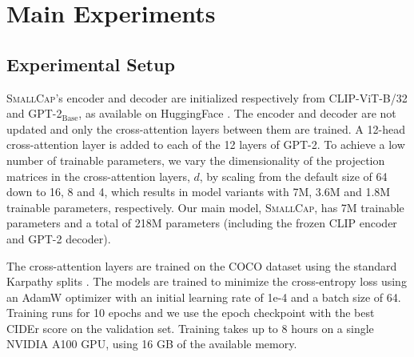 \documentclass[10pt,twocolumn,letterpaper]{article}
\newcommand{\model}{\textsc{SmallCap}\xspace}
\begin{document}


\section{Main Experiments}






\subsection{Experimental Setup}
\label{experimental_setup}

\model's encoder and decoder are initialized respectively from CLIP-ViT-B/32 and GPT-2$_{\text{Base}}$, as available on HuggingFace \cite{wolf2020transformers}. The encoder and decoder are not updated and only the cross-attention layers between them are trained.
A 12-head cross-attention layer is added to each of the 12 layers of GPT-2.
To achieve a low number of trainable parameters, we vary the dimensionality of the projection matrices in the cross-attention layers, $d$, by scaling from the default size of 64 down to 16, 8 and 4, which results in model variants with 7M, 3.6M and 1.8M trainable parameters, respectively. Our main model, \model, has 7M trainable parameters and a total of 218M parameters (including the frozen CLIP encoder and GPT-2 decoder).

The cross-attention layers are trained on the COCO dataset  \cite{chen2015microsoft} using the standard Karpathy splits \cite{karpathy2015deep}. The models are trained to minimize the cross-entropy loss using an AdamW optimizer \cite{loshchilov2018fixing} with an initial learning rate of 1e-4 and a batch size of 64. Training runs for 10 epochs and we use the epoch checkpoint with the best CIDEr score on the validation set. Training takes up to 8 hours on a single NVIDIA A100 GPU, using 16 GB of the available memory. %
\end{document}
